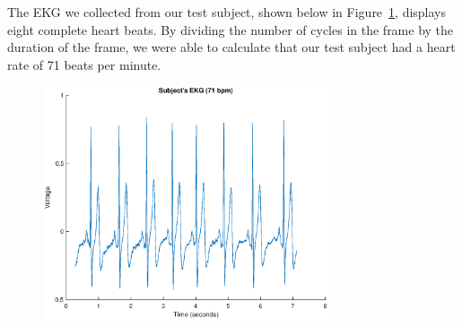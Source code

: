 \documentclass[11pt]{article}
\begin{document}
The EKG we collected from our test subject, shown below in Figure~\ref{fig:ekg}, displays eight complete heart beats. By dividing the number of cycles in the frame by the duration of the frame, we were able to calculate that our test subject had a heart rate of 71 beats per minute.

\begin{figure} [!ht]

	\centering  %
	
	\includegraphics[width=0.75\textwidth]{ekg.eps}
	
	
	\caption{}
	
	\label{fig:ekg}
\end{figure}
\end{document}
